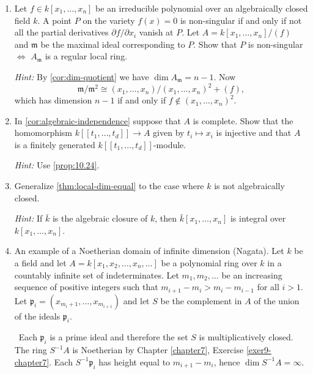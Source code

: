 
\begin{enumerate}
    \item \label{exer1-chapter11}Let $f \in k[x_1, \ldots, x_n]$ be an irreducible polynomial over an algebraically closed field $k$. A point $P$ on the variety $f(x) = 0$ is non-singular if and only if not all the partial derivatives $\partial f/\partial x_i$ vanish at $P$. Let $A = k[x_1, \ldots, x_n]/(f)$ and $\mathfrak{m}$ be the maximal ideal corresponding to $P$. Show that $P$ is non-singular $\iff$ $A_{\mathfrak{m}}$ is a regular local ring.
    
    \textit{Hint:} By \eqref{cor:dim-quotient} we have $\dim A_{\mathfrak{m}} = n-1$. Now \[\mathfrak{m}/\mathfrak{m}^2 \cong (x_1, \ldots, x_n)/(x_1, \ldots, x_n)^2 + (f),\] which has dimension $n-1$ if and only if $f \notin (x_1, \ldots, x_n)^2$.

    \item \label{exer2-chapter11}In \eqref{cor:algebraic-independence} suppose that $A$ is complete. Show that the homomorphism $k[[t_1, \ldots, t_d]] \to A$ given by $t_i \mapsto x_i$ is injective and that $A$ is a finitely generated $k[[t_1, \ldots, t_d]]$-module.
    
    \textit{Hint:} Use \eqref{prop:10.24}.

    \item \label{exer3-chapter11}Generalize \eqref{thm:local-dim-equal} to the case where $k$ is not algebraically closed.
    
    \textit{Hint:} If $\bar{k}$ is the algebraic closure of $k$, then $\bar{k}[x_1, \ldots, x_n]$ is integral over $k[x_1, \ldots, x_n]$.

    \item \label{exer4-chapter11}An example of a Noetherian domain of infinite dimension (Nagata). Let $k$ be a field and let $A = k[x_1, x_2, \ldots, x_n, \ldots]$ be a polynomial ring over $k$ in a countably infinite set of indeterminates. Let $m_1, m_2, \ldots$ be an increasing sequence of positive integers such that $m_{i+1} - m_i > m_i - m_{i-1}$ for all $i > 1$. Let $\mathfrak{p}_i = (x_{m_i+1}, \ldots, x_{m_{i+1}})$ and let $S$ be the complement in $A$ of the union of the ideals $\mathfrak{p}_i$.

    \quad\, Each $\mathfrak{p}_i$ is a prime ideal and therefore the set $S$ is multiplicatively closed. The ring $S^{-1}A$ is Noetherian by Chapter \ref{chapter7}, Exercise \ref{exer9-chapter7}. Each $S^{-1}\mathfrak{p}_i$ has height equal to $m_{i+1} - m_i$, hence $\dim S^{-1}A = \infty$.


\end{enumerate}
